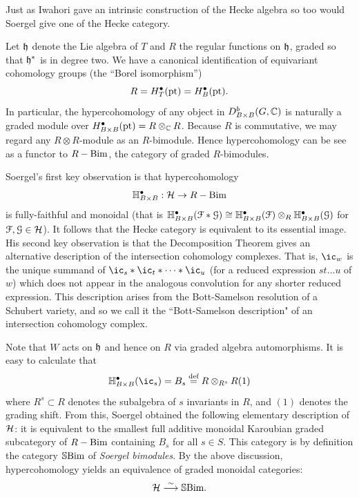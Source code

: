 Just as Iwahori gave an intrinsic construction of the Hecke algebra so too would Soergel give one of the Hecke category.

Let ${\mathfrak h}$ denote the Lie algebra of $T$ and $R$ the regular functions on ${\mathfrak h}$, graded so that ${\mathfrak h}^*$ is in degree two. We have a canonical identification of equivariant cohomology groups
(the ``Borel isomorphism'') \[ R = H^{\bullet}_T({\mathrm{pt}}) = H^{\bullet}_B({\mathrm{pt}}). \] In particular, the hypercohomology of any object in $ D^b_{B \times B}(G, {\mathbb{C}})$ is naturally a graded module
over $H^{\bullet}_{B \times B}({\mathrm{pt}}) = R \otimes_{{\mathbb{C}}} R$. Because $R$ is commutative, we may regard any $R \otimes R$-module as an $R$-bimodule. Hence hypercohomology can be see as a functor to 
$R-\mathrm{Bim}$, the category of graded $R$-bimodules.

Soergel's first key observation is that hypercohomology \[ {\mathbb{H}}^{\bullet}_{B \times B} : {\mathcal{H}} \rightarrow R-\mathrm{Bim} \] is fully-faithful and monoidal (that is ${\mathbb{H}}^{\bullet}_{B \times B}({\EuScript F} * {\EuScript G}) \cong {\mathbb{H}}^{\bullet}_{B \times B}({\EuScript F}) \otimes_R {\mathbb{H}}^{\bullet}_{B \times B}({\EuScript G})$ for ${\EuScript F}, {\EuScript G} \in {\mathcal{H}}$). It follows that the Hecke category is
equivalent to its essential image. His second key observation is that the Decomposition Theorem gives an alternative description of the intersection cohomology complexes. That is,
$\ic_w$ is the unique summand of $\ic_s * \ic_t * \cdots * \ic_u$ (for a reduced expression $st\ldots u$ of $w$) which does not appear in the analogous convolution for any shorter reduced
expression. This description arises from the Bott-Samelson resolution of a Schubert variety, and so we call it the ``Bott-Samelson description" of an intersection cohomology complex.

Note that $W$ acts on ${\mathfrak h}$ and hence on $R$ via graded algebra automorphisms. It is easy to calculate that
\[
\HM^{\bullet}_{B \times B} (\ic_s) = B_s \define R \otimes_{R^s} R(1)
\]
where $R^s \subset R$ denotes the subalgebra of $s$ invariants in $R$, and $(1)$ denotes the grading shift. From this, Soergel obtained the following elementary description of ${\mathcal{H}}$: it is equivalent to the smallest full additive monoidal Karoubian graded subcategory of $R-\mathrm{Bim}$ containing $B_s$ for all $s \in S$. This category is by definition the category $\mathbb{S}\textrm{Bim}$ of \emph{Soergel bimodules}. By the above discussion, hypercohomology yields an equivalence of graded monoidal categories:
\[
{\mathcal{H}} \stackrel{\sim}{\longrightarrow} \mathbb{S}\textrm{Bim}.
\]


